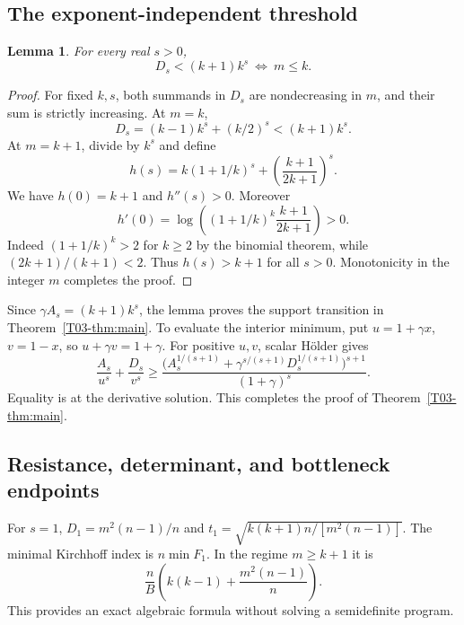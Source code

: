 \documentclass[11pt,a4paper]{article}
\newtheorem{lemma}[theorem]{Lemma}
\theoremstyle{definition}\newtheorem{definition}[theorem]{Definition}
\theoremstyle{remark}\newtheorem{remark}[theorem]{Remark}
\numberwithin{equation}{section}
\begin{document}
\subsection{The exponent-independent threshold}\label{T03-sec-3}
\begin{lemma}\label{T03-lem:threshold}
For every real $s>0$,
\[
 D_s<(k+1)k^s\ \Longleftrightarrow\ m\le k.
\]
\end{lemma}
\begin{proof}
For fixed $k,s$, both summands in $D_s$ are nondecreasing in $m$, and their sum is strictly increasing. At $m=k$,
\[
 D_s=(k-1)k^s+(k/2)^s<(k+1)k^s.
\]
At $m=k+1$, divide by $k^s$ and define
\[
 h(s)=k(1+1/k)^s+\left(\frac{k+1}{2k+1}\right)^s.
\]
We have $h(0)=k+1$ and $h''(s)>0$. Moreover
\[
 h'(0)=\log\left((1+1/k)^k\frac{k+1}{2k+1}\right)>0.
\]
Indeed $(1+1/k)^k>2$ for $k\ge2$ by the binomial theorem, while $(2k+1)/(k+1)<2$. Thus $h(s)>k+1$ for all $s>0$. Monotonicity in the integer $m$ completes the proof.
\end{proof}
Since $\gamma A_s=(k+1)k^s$, the lemma proves the support transition in Theorem~\ref{T03-thm:main}. To evaluate the interior minimum, put $u=1+\gamma x$, $v=1-x$, so $u+\gamma v=1+\gamma$. For positive $u,v$, scalar H\"older gives
\[
 \frac{A_s}{u^s}+\frac{D_s}{v^s}\ge
 \frac{\big(A_s^{1/(s+1)}+\gamma^{s/(s+1)}D_s^{1/(s+1)}\big)^{s+1}}
 {(1+\gamma)^s}.
\]
Equality is at the derivative solution. This completes the proof of Theorem~\ref{T03-thm:main}.

\subsection{Resistance, determinant, and bottleneck endpoints}\label{T03-sec-4}
For $s=1$, $D_1=m^2(n-1)/n$ and $t_1=\sqrt{k(k+1)n/[m^2(n-1)]}$. The minimal Kirchhoff index is $n\min F_1$. In the regime $m\ge k+1$ it is
\[
 \frac nB\left(k(k-1)+\frac{m^2(n-1)}n\right).
\]
This provides an exact algebraic formula without solving a semidefinite program.
\end{document}
